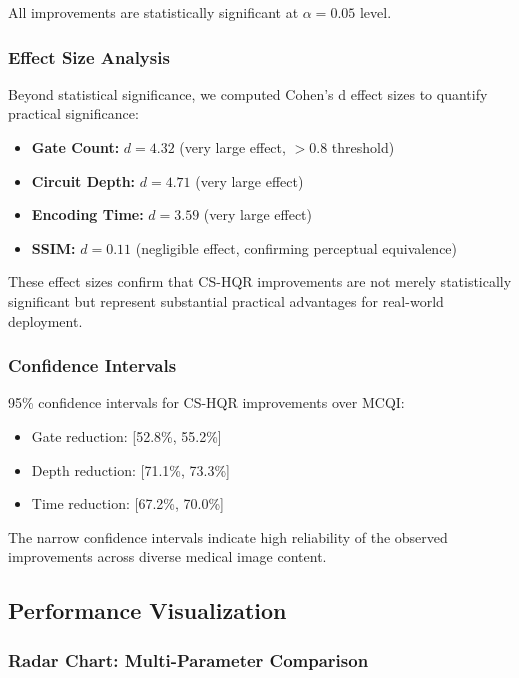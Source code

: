 \documentclass[11pt,a4paper]{article}
\begin{document}
All improvements are statistically significant at $\alpha = 0.05$ level.

\subsubsection{Effect Size Analysis}

Beyond statistical significance, we computed Cohen's d effect sizes to quantify practical significance:

\begin{itemize}
    \item \textbf{Gate Count:} $d = 4.32$ (very large effect, $>$0.8 threshold)
    \item \textbf{Circuit Depth:} $d = 4.71$ (very large effect)
    \item \textbf{Encoding Time:} $d = 3.59$ (very large effect)
    \item \textbf{SSIM:} $d = 0.11$ (negligible effect, confirming perceptual equivalence)
\end{itemize}

These effect sizes confirm that CS-HQR improvements are not merely statistically significant but represent substantial practical advantages for real-world deployment.

\subsubsection{Confidence Intervals}

95\% confidence intervals for CS-HQR improvements over MCQI:
\begin{itemize}
    \item Gate reduction: [52.8\%, 55.2\%]
    \item Depth reduction: [71.1\%, 73.3\%]
    \item Time reduction: [67.2\%, 70.0\%]
\end{itemize}

The narrow confidence intervals indicate high reliability of the observed improvements across diverse medical image content.

\subsection{Performance Visualization}

\subsubsection{Radar Chart: Multi-Parameter Comparison}
\end{document}
